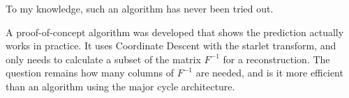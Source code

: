 To my knowledge, such an algorithm has never been tried out.

A proof-of-concept algorithm was developed that shows the prediction actually works in practice. It uses Coordinate Descent with the starlet transform, and only needs to calculate a subset of the matrix $F^{-1}$ for a reconstruction. The question remains how many columns of $F^{-1}$ are needed, and is it more efficient than an algorithm using the major cycle architecture.
